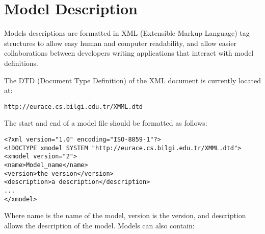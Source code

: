 \section{Model Description}
\label{model_description}

Models descriptions are formatted in XML (Extensible Markup Language) tag
structures to allow easy human and computer readability, and allow easier collaborations between
developers writing applications that interact with model definitions.

The DTD (Document Type Definition) of the XML document is currently located
at:

\begin{mylisting}
\begin{verbatim}
http://eurace.cs.bilgi.edu.tr/XMML.dtd
\end{verbatim}
\end{mylisting}

The start and end of a model file should be formatted as follows:

\begin{mylisting}
\begin{verbatim}
<?xml version="1.0" encoding="ISO-8859-1"?>
<!DOCTYPE xmodel SYSTEM "http://eurace.cs.bilgi.edu.tr/XMML.dtd">
<xmodel version="2">
<name>Model_name</name>
<version>the version</version>
<description>a description</description>
...
</xmodel>
\end{verbatim}
\end{mylisting}

Where name is the name of the model, version is the version, and description
allows the description of the model. Models can also contain:

